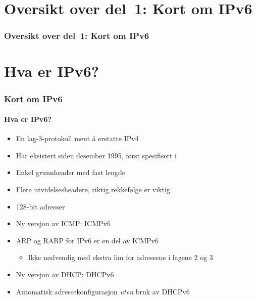 \begin{frame}
  \partpage
\end{frame}

\section*{Oversikt over del~1: Kort om IPv6}
\begin{frame}%
  \frametitle{Oversikt over del~1: Kort om IPv6}
    \tableofcontents%
\end{frame}

\section{Hva er IPv6?}
\begin{frame}%
  \frametitle{Kort om IPv6}
  \framesubtitle{Hva er IPv6?}
  \pause
  \begin{itemize}[<+->]
  \item En lag-3-protokoll ment å erstatte IPv4
  \item Har eksistert siden desember 1995, først spesifisert i 
  \item Enkel grunnheader med fast lengde
  \item Flere utvidelsesheadere, riktig rekkefølge er viktig
  \item \alert<12>{128-bit adresser}
  \item Ny versjon av ICMP: ICMPv6
  \item ARP og RARP for IPv6 er en del av ICMPv6
    \begin{itemize}[<+->]
    \item Ikke nødvendig med ekstra lim for adressene i lagene 2 og 3
    \end{itemize}
  \item Ny versjon av DHCP: DHCPv6
  \item \alert<12>{Automatisk adressekonfigurasjon \textit{uten\/} bruk av DHCPv6}
  \end{itemize}
\end{frame}

